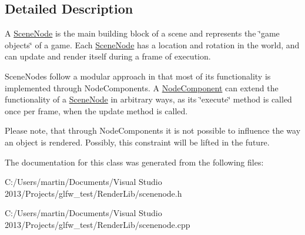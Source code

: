 \subsection{Detailed Description}
A \hyperlink{class_scene_node}{Scene\+Node} is the main building block of a scene and represents the \char`\"{}game objects\char`\"{} of a game. Each \hyperlink{class_scene_node}{Scene\+Node} has a location and rotation in the world, and can update and render itself during a frame of execution. 

Scene\+Nodes follow a modular approach in that most of its functionality is implemented through Node\+Components. A \hyperlink{class_node_component}{Node\+Component} can extend the functionality of a \hyperlink{class_scene_node}{Scene\+Node} in arbitrary ways, as its \char`\"{}execute\char`\"{} method is called once per frame, when the update method is called.

Please note, that through Node\+Components it is not possible to influence the way an object is rendered. Possibly, this constraint will be lifted in the future. 

The documentation for this class was generated from the following files\+:\begin{DoxyCompactItemize}
\item 
C\+:/\+Users/martin/\+Documents/\+Visual Studio 2013/\+Projects/glfw\+\_\+test/\+Render\+Lib/scenenode.\+h\item 
C\+:/\+Users/martin/\+Documents/\+Visual Studio 2013/\+Projects/glfw\+\_\+test/\+Render\+Lib/scenenode.\+cpp\end{DoxyCompactItemize}
